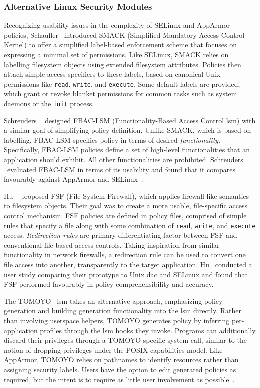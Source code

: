 \subsubsection*{Alternative Linux Security Modules}

Recognizing usability issues in the complexity of SELinux and AppArmor policies,
Schaufler~\cite{schaufler_smack} introduced SMACK (Simplified Mandatory Access Control
Kernel) to offer a simplified label-based enforcement scheme that focuses on expressing
a minimal set of permissions. Like SELinux, SMACK relies on labelling filesystem objects
using extended filesystem attributes. Policies then attach simple access specifiers to
these labels, based on canonical Unix permissions like \texttt{read}, \texttt{write}, and
\texttt{execute}. Some default labels are provided, which grant or revoke blanket
permissions for common tasks such as system daemons or the \texttt{init} process.

Schreuders \etal~\cite{schreuders2012_towards} designed FBAC-LSM (Functionality-Based
Access Control \gls{lsm}) with a similar goal of simplifying policy definition. Unlike
SMACK, which is based on labelling, FBAC-LSM specifies policy in terms of desired
\textit{functionality}. Specifically, FBAC-LSM policies define a set of high-level
functionalities that an application should exhibit. All other functionalities are
prohibited. Schreuders \etal~evaluated FBAC-LSM in terms of its usability and found that
it compares favourably against AppArmor and SELinux~\cite{schreuders2012_towards}.

Hu \etal~\cite{hu2013_fsf} proposed FSF (File System Firewall), which applies
firewall-like semantics to filesystem objects. Their goal was to create a more usable,
file-specific access control mechanism. FSF policies are defined in policy files,
comprised of simple rules that specify a file along with some combination of
\texttt{read}, \texttt{write}, and \texttt{execute} access. \textit{Redirection rules} are
primary differentiating factor between FSF and conventional file-based access controls.
Taking inspiration from similar functionality in network firewalls, a redirection rule can
be used to convert one file access into another, transparently to the target application.
Hu \etal~conducted a user study comparing their prototype to Unix \gls{dac} and SELinux
and found that FSF performed favourably in policy comprehensibility and accuracy.

The TOMOYO~\cite{harada2004_tomoyo} \gls{lsm} takes an alternative approach, emphasizing
policy generation and building generation functionality into the \gls{lsm} directly.
Rather than involving userspace helpers, TOMOYO generates policy by inferring
per-application profiles through the \gls{lsm} hooks they invoke. Programs can
additionally discard their privileges through a TOMOYO-specific system call, similar to
the notion of dropping privileges under the POSIX capabilities model. Like AppArmor,
TOMOYO relies on pathnames to identify resources rather than assigning security labels.
Users have the option to edit generated policies as required, but the intent is to require
as little user involvement as possible~\cite{harada2004_tomoyo}.

